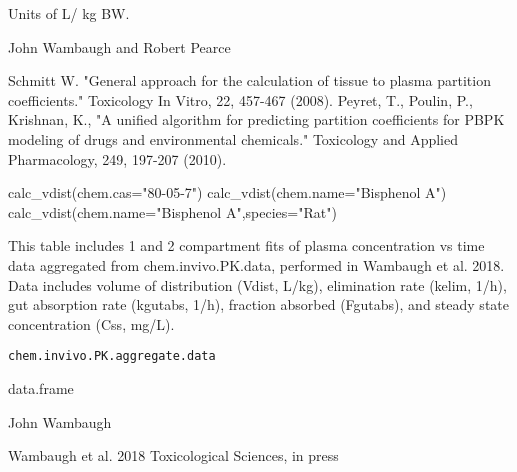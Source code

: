 \documentclass[a4paper]{book}
\begin{document}
%
\begin{Value}
\begin{ldescription}
\item[\code{Volume of distribution}] Units of L/ kg BW.
\end{ldescription}
\end{Value}
%
\begin{Author}\relax
John Wambaugh and Robert Pearce
\end{Author}
%
\begin{References}\relax
Schmitt W. "General approach for the calculation of tissue to
plasma partition coefficients." Toxicology In Vitro, 22, 457-467 (2008).
Peyret, T., Poulin, P., Krishnan, K., "A unified algorithm for predicting
partition coefficients for PBPK modeling of drugs and environmental
chemicals." Toxicology and Applied Pharmacology, 249, 197-207 (2010).
\end{References}
%
\begin{Examples}
\begin{ExampleCode}

calc_vdist(chem.cas="80-05-7")
calc_vdist(chem.name="Bisphenol A")
calc_vdist(chem.name="Bisphenol A",species="Rat")

\end{ExampleCode}
\end{Examples}
%
\begin{Description}\relax
This table includes 1 and 2 compartment fits of plasma concentration vs time
data aggregated from chem.invivo.PK.data, performed in Wambaugh et al. 2018.
Data includes volume of distribution (Vdist, L/kg), elimination rate (kelim,
1/h), gut absorption rate (kgutabs, 1/h), fraction absorbed (Fgutabs), and
steady state concentration (Css, mg/L).
\end{Description}
%
\begin{Usage}
\begin{verbatim}
chem.invivo.PK.aggregate.data
\end{verbatim}
\end{Usage}
%
\begin{Format}
data.frame
\end{Format}
%
\begin{Author}\relax
John Wambaugh
\end{Author}
%
\begin{Source}\relax
Wambaugh et al. 2018 Toxicological Sciences, in press
\end{Source}
\end{document}
